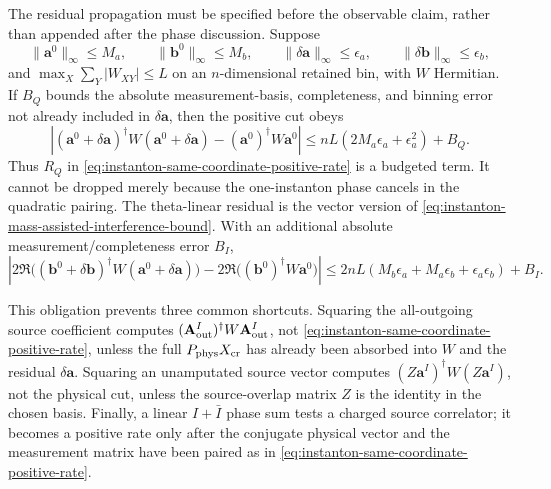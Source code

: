 \begin{remark}
The residual propagation must be specified before the observable claim, rather
than appended after the phase discussion.  Suppose
\[
  \|\mathbf a^0\|_{\infty}\le M_a,\qquad
  \|\mathbf b^0\|_{\infty}\le M_b,\qquad
  \|\delta\mathbf a\|_{\infty}\le\epsilon_a,\qquad
  \|\delta\mathbf b\|_{\infty}\le\epsilon_b,
\]
and \(\max_X\sum_Y|W_{XY}|\le L\) on an \(n\)-dimensional retained bin, with
\(W\) Hermitian.  If \(B_Q\) bounds the absolute measurement-basis,
completeness, and binning error not already included in \(\delta\mathbf a\),
then the positive cut obeys
\begin{equation}
  \left|
  (\mathbf a^0+\delta\mathbf a)^\dagger
  W(\mathbf a^0+\delta\mathbf a)
  -
  (\mathbf a^0)^\dagger W\mathbf a^0
  \right|
  \le
  nL\left(2M_a\epsilon_a+\epsilon_a^2\right)+B_Q .
  \label{eq:instanton-same-coordinate-positive-rate-bound}
\end{equation}
Thus \(R_Q\) in \eqref{eq:instanton-same-coordinate-positive-rate} is a
budgeted term.  It cannot be dropped merely because the one-instanton phase
cancels in the quadratic pairing.  The theta-linear residual is the vector
version of \eqref{eq:instanton-mass-assisted-interference-bound}.  With an
additional absolute measurement/completeness error \(B_I\),
\begin{equation}
  \left|
  2\Re\bigl((\mathbf b^0+\delta\mathbf b)^\dagger
  W(\mathbf a^0+\delta\mathbf a)\bigr)
  -
  2\Re\bigl((\mathbf b^0)^\dagger W\mathbf a^0\bigr)
  \right|
  \le
  2nL\left(M_b\epsilon_a+M_a\epsilon_b+\epsilon_a\epsilon_b\right)+B_I .
  \label{eq:instanton-same-coordinate-interference-bound}
\end{equation}

This obligation prevents three common shortcuts.  Squaring the all-outgoing source
coefficient computes
\((\mathbf A_{\rm out}^{I})^\dagger W\mathbf A_{\rm out}^{I}\), not
\eqref{eq:instanton-same-coordinate-positive-rate}, unless the full
\(P_{\rm phys}X_{\rm cr}\) has already been absorbed into \(W\) and the
residual \(\delta\mathbf a\).  Squaring an unamputated source vector computes
\((Z\mathbf a^I)^\dagger W(Z\mathbf a^I)\), not the physical cut, unless the
source-overlap matrix \(Z\) is the identity in the chosen basis.  Finally, a
linear \(I+\bar I\) phase sum tests a charged source correlator; it becomes a
positive rate only after the conjugate physical vector and the measurement
matrix have been paired as in
\eqref{eq:instanton-same-coordinate-positive-rate}.
\end{remark}

